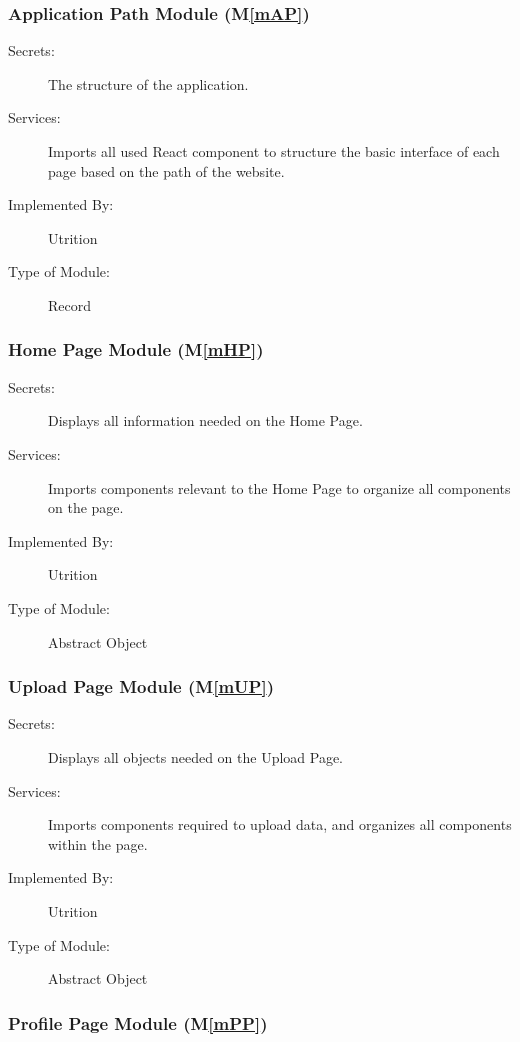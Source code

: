 \documentclass[12pt, titlepage]{article}
\newcommand{\mref}[1]{M\ref{#1}}
\begin{document}
\subsubsection{Application Path Module (\mref{mAP})}

\begin{description}
	\item[Secrets:] The structure of the application.
	\item[Services:] Imports all used React component to structure the basic 
	interface of each page based on the path of the website.
	\item[Implemented By:] Utrition
	\item[Type of Module:] Record
\end{description}

\subsubsection{Home Page Module (\mref{mHP})}

\begin{description}
\item[Secrets:]Displays all information needed on the Home Page.
\item[Services:] Imports components relevant to the Home Page to organize all components on the page. 
\item[Implemented By:] Utrition
\item[Type of Module:] Abstract Object
\end{description}

\subsubsection{Upload Page Module (\mref{mUP})}

\begin{description}
	\item[Secrets:]Displays all objects needed on the Upload Page.
	\item[Services:] Imports components required to upload data, and organizes 
	all 
	components within the page. 
	\item[Implemented By:] Utrition
	\item[Type of Module:] Abstract Object
\end{description}

\subsubsection{Profile Page Module (\mref{mPP})}
\end{document}
